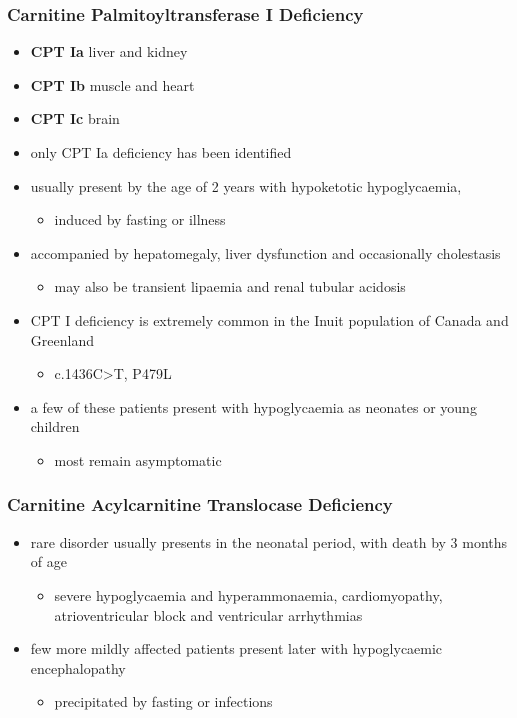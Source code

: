 \documentclass{scrartcl}
\begin{document}
\subsubsection{Carnitine Palmitoyltransferase I Deficiency}
\label{sec:orge50690b}
\begin{itemize}
\item \textbf{CPT Ia} liver and kidney
\item \textbf{CPT Ib}  muscle and heart
\item \textbf{CPT Ic}  brain

\item only CPT Ia deficiency has been identified
\item usually present by the age of 2 years with hypoketotic hypoglycaemia,
\begin{itemize}
\item induced by fasting or illness
\end{itemize}
\item accompanied by hepatomegaly, liver dysfunction and occasionally cholestasis
\begin{itemize}
\item may also be transient lipaemia and renal tubular acidosis
\end{itemize}
\item CPT I deficiency is extremely common in the Inuit population of Canada and Greenland
\begin{itemize}
\item c.1436C>T, P479L
\end{itemize}
\item a few of these patients present with hypoglycaemia as neonates or young children
\begin{itemize}
\item most remain asymptomatic
\end{itemize}
\end{itemize}

\subsubsection{Carnitine Acylcarnitine Translocase Deficiency}
\label{sec:orgad87270}

\begin{itemize}
\item rare disorder usually presents in the neonatal period, with
death by 3 months of age
\begin{itemize}
\item severe hypoglycaemia and hyperammonaemia, cardiomyopathy,
atrioventricular block and ventricular arrhythmias
\end{itemize}
\item few more mildly affected patients present later with hypoglycaemic
encephalopathy
\begin{itemize}
\item precipitated by fasting or infections
\end{itemize}
\end{itemize}
\end{document}

